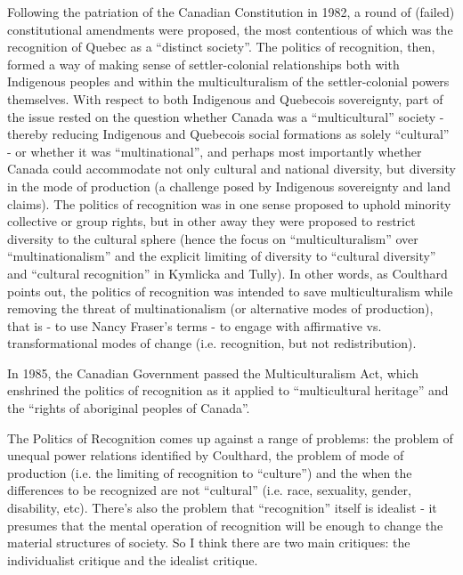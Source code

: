 \documentclass[12pt,oneside]{memoir}
\begin{document}
Following the patriation of the Canadian Constitution in 1982, a round of (failed) constitutional amendments were proposed, the most contentious of which was the recognition of Quebec as a ``distinct society''. The politics of recognition, then, formed a way of making sense of settler-colonial relationships both with Indigenous peoples and within the multiculturalism of the settler-colonial powers themselves. With respect to both Indigenous and Quebecois sovereignty, part of the issue rested on the question whether Canada was a ``multicultural'' society - thereby reducing Indigenous and Quebecois social formations as solely ``cultural'' - or whether it was ``multinational'', and perhaps most importantly whether Canada could accommodate not only cultural and national diversity, but diversity in the mode of production (a challenge posed by Indigenous sovereignty and land claims). The politics of recognition was in one sense proposed to uphold minority collective or group rights, but in other away they were proposed to restrict diversity to the cultural sphere (hence the focus on ``multiculturalism'' over ``multinationalism'' and the explicit limiting of diversity to ``cultural diversity'' and ``cultural recognition'' in Kymlicka and Tully). In other words, as Coulthard points out, the politics of recognition was intended to save multiculturalism while removing the threat of multinationalism (or alternative modes of production), that is - to use Nancy Fraser's terms - to engage with affirmative vs. transformational modes of change (i.e. recognition, but not redistribution).

In 1985, the Canadian Government passed the Multiculturalism Act, which enshrined the politics of recognition as it applied to ``multicultural heritage'' and the ``rights of aboriginal peoples of Canada''. 

The Politics of Recognition comes up against a range of problems: the problem of unequal power relations identified by Coulthard, the problem of mode of production (i.e. the limiting of recognition to ``culture'') and the when the differences to be recognized are not ``cultural'' (i.e. race, sexuality, gender, disability, etc). There's also the problem that ``recognition'' itself is idealist - it presumes that the mental operation of recognition will be enough to change the material structures of society. So I think there are two main critiques: the individualist critique and the idealist critique. 
\end{document}
